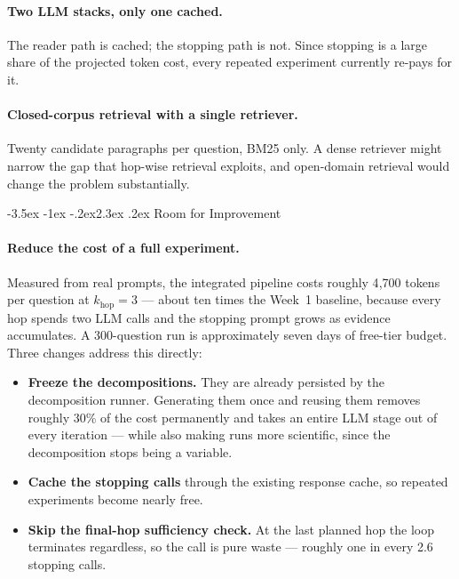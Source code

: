 \documentclass[11pt,a4paper]{article}
\makeatletter
\renewcommand\section{\@startsection{section}{1}{\z@}%
  {-3.5ex \@plus -1ex \@minus -.2ex}{2.3ex \@plus.2ex}%
  {\color{ink}\normalfont\Large\bfseries}}
\makeatother
\begin{document}
\paragraph{Two LLM stacks, only one cached.}
The reader path is cached; the stopping path is not. Since stopping is a large
share of the projected token cost, every repeated experiment currently re-pays
for it.

\paragraph{Closed-corpus retrieval with a single retriever.}
Twenty candidate paragraphs per question, BM25 only. A dense retriever might
narrow the gap that hop-wise retrieval exploits, and open-domain retrieval would
change the problem substantially.

\section{Room for Improvement}

\paragraph{Reduce the cost of a full experiment.}
Measured from real prompts, the integrated pipeline costs roughly 4{,}700 tokens
per question at $k_{\text{hop}}=3$ --- about ten times the Week~1 baseline,
because every hop spends two LLM calls and the stopping prompt grows as evidence
accumulates. A 300-question run is approximately seven days of free-tier budget.
Three changes address this directly:

\begin{itemize}
  \item \textbf{Freeze the decompositions.} They are already persisted by the
        decomposition runner. Generating them once and reusing them removes
        roughly 30\% of the cost permanently and takes an entire LLM stage out of
        every iteration --- while also making runs more scientific, since the
        decomposition stops being a variable.
  \item \textbf{Cache the stopping calls} through the existing response cache, so
        repeated experiments become nearly free.
  \item \textbf{Skip the final-hop sufficiency check.} At the last planned hop
        the loop terminates regardless, so the call is pure waste --- roughly one
        in every 2.6 stopping calls.
\end{itemize}
\end{document}
